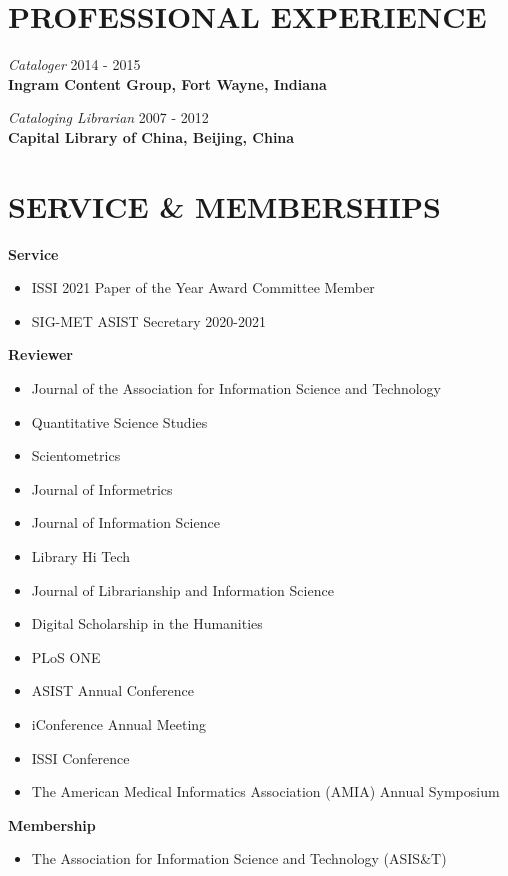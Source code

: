 \documentclass[margin, 10pt]{res} %
\begin{document}
\begin{resume}
\section{PROFESSIONAL EXPERIENCE}

\textit{Cataloger} \hfill 2014 - 2015\\
\textbf{Ingram Content Group, Fort Wayne, Indiana}

\textit{Cataloging Librarian} \hfill 2007 - 2012\\
\textbf{Capital Library of China, Beijing, China}

\section{SERVICE \& MEMBERSHIPS}

\textbf{Service}
\begin{itemize}
\item ISSI 2021 Paper of the Year Award Committee Member
\item SIG-MET ASIST Secretary 2020-2021
\end{itemize}


\textbf{Reviewer}
\begin{itemize}
\item Journal of the Association for Information Science and Technology
\item Quantitative Science Studies
\item Scientometrics
\item Journal of Informetrics
\item Journal of Information Science
\item Library Hi Tech
\item Journal of Librarianship and Information Science
\item Digital Scholarship in the Humanities
\item PLoS ONE
\item ASIST Annual Conference
\item iConference Annual Meeting
\item ISSI Conference
\item The American Medical Informatics Association (AMIA) Annual Symposium
\end{itemize}

\textbf{Membership}
\begin{itemize}
\item The Association for Information Science and Technology (ASIS\&T)
\end{itemize}


\end{resume}
\end{document}
